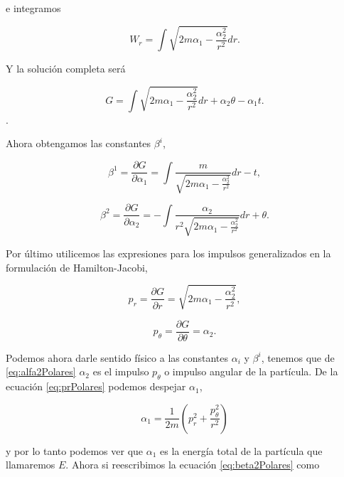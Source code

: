 \documentclass[a4paper,10pt]{article}
\numberwithin{equation}{section}
\begin{document}
e integramos 

\begin{equation}
 W_r = \int \sqrt{2m\alpha_1 - \frac{\alpha_2^2}{r^2}} dr.
\end{equation}

Y la solución completa será 

\begin{equation}
 G = \int \sqrt{2m\alpha_1 - \frac{\alpha_2^2}{r^2}} dr + \alpha_2\theta - \alpha_1t.
\end{equation}.

Ahora obtengamos las constantes $\beta^i$, 

\begin{equation}
 \beta^1 = \frac{\partial G}{\partial \alpha_1} = 
 \int \frac{m}{\sqrt{2m\alpha_1 - \frac{\alpha_2^2}{r^2}}}dr - t,
 \label{eq:beta1Polares}
\end{equation}

\begin{equation}
 \beta^2 = \frac{\partial G}{\partial \alpha_2} = 
 - \int \frac{\alpha_2}{r^2\sqrt{2m\alpha_1 - \frac{\alpha_2^2}{r^2}}}dr + \theta.
 \label{eq:beta2Polares}
\end{equation}

Por último utilicemos las expresiones para los impulsos generalizados en la formulación 
de Hamilton-Jacobi, 

\begin{equation}
 p_r = \frac{\partial G}{\partial r} = \sqrt{2m\alpha_1 - \frac{\alpha_2^2}{r^2}},
 \label{eq:prPolares}
\end{equation}

\begin{equation}
 p_\theta = \frac{\partial G}{\partial \theta} = \alpha_2.
 \label{eq:alfa2Polares}
\end{equation}

Podemos ahora darle sentido físico a las constantes $\alpha_i$ y $\beta^i$, tenemos que 
de \eqref{eq:alfa2Polares} $\alpha_2$ es el impulso $p_\theta$ o impulso angular 
de la partícula. De la ecuación \eqref{eq:prPolares} podemos despejar $\alpha_1$,

\begin{equation}
 \alpha_1 = \frac{1}{2m} \left(p_r^2 + \frac{p_\theta^2}{r^2}\right) 
\end{equation}

y por lo tanto podemos ver que $\alpha_1$ es la energía total de la partícula que llamaremos 
$E$. Ahora si reescribimos la ecuación \eqref{eq:beta2Polares} como 
\end{document}
